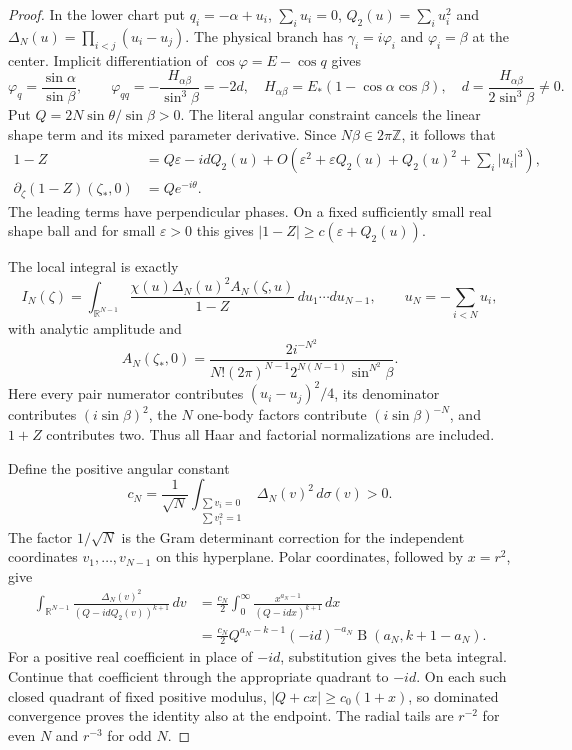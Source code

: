 \documentclass[11pt]{article}
\numberwithin{equation}{section}
\theoremstyle{definition}
\newcommand{\R}{\mathbb R}
\newcommand{\Z}{\mathbb Z}
\newcommand{\eps}{\varepsilon}
\begin{document}
\begin{proof}
In the lower chart put $q_i=-\alpha+u_i$, $\sum_i u_i=0$,
$Q_2(u)=\sum_i u_i^2$ and $\Delta_N(u)=\prod_{i<j}(u_i-u_j)$.
The physical branch has $\gamma_i=i\varphi_i$ and
$\varphi_i=\beta$ at the center. Implicit differentiation of
$\cos\varphi=E-\cos q$ gives
\[
 \varphi_q=\frac{\sin\alpha}{\sin\beta},\qquad
 \varphi_{qq}=-\frac{H_{\alpha\beta}}{\sin^3\beta}=-2d,
 \quad H_{\alpha\beta}=E_*(1-\cos\alpha\cos\beta),
 \quad d=\frac{H_{\alpha\beta}}{2\sin^3\beta}\ne0.
\]
Put $Q=2N\sin\theta/\sin\beta>0$. The literal angular constraint
cancels the linear shape term and its mixed parameter derivative.
Since $N\beta\in2\pi\Z$, it follows that
\begin{align}
 1-Z&=Q\eps-id Q_2(u)
   +O\left(\eps^2+\eps Q_2(u)+Q_2(u)^2+\sum_i|u_i|^3\right),
                                                     \label{iso:local-q}\\
 \partial_\zeta(1-Z)(\zeta_*,0)&=Qe^{-i\theta}.
                                                     \label{iso:local-derivative}
\end{align}
The leading terms have perpendicular phases. On a fixed sufficiently
small real shape ball and for small $\eps>0$ this gives
$|1-Z|\ge c(\eps+Q_2(u))$.

The local integral is exactly
\[
 I_N(\zeta)=\int_{\R^{N-1}}
       \frac{\chi(u)\Delta_N(u)^2 A_N(\zeta,u)}{1-Z}\,
                          du_1\cdots du_{N-1},
 \qquad u_N=-\sum_{i<N}u_i,
\]
with analytic amplitude and
\[
 A_N(\zeta_*,0)=
 \frac{2i^{-N^2}}{N!(2\pi)^{N-1}2^{N(N-1)}\sin^{N^2}\beta}.
\]
Here every pair numerator contributes $(u_i-u_j)^2/4$, its
denominator contributes $(i\sin\beta)^2$, the $N$ one-body
factors contribute $(i\sin\beta)^{-N}$, and $1+Z$ contributes
two. Thus all Haar and factorial normalizations are included.

Define the positive angular constant
\[
 c_N=\frac1{\sqrt N}
   \int_{\substack{\sum v_i=0\\\sum v_i^2=1}}
                 \Delta_N(v)^2\,d\sigma(v)>0.
\]
The factor $1/\sqrt N$ is the Gram determinant correction for
the independent coordinates $v_1,\ldots,v_{N-1}$ on this
hyperplane. Polar coordinates, followed by $x=r^2$, give
\begin{align*}
 \int_{\R^{N-1}}\frac{\Delta_N(v)^2}{(Q-id Q_2(v))^{k+1}}\,dv
 &=\frac{c_N}{2}\int_0^\infty
                \frac{x^{a_N-1}}{(Q-id x)^{k+1}}\,dx\\
 &=\frac{c_N}{2}Q^{a_N-k-1}(-id)^{-a_N}
                         \operatorname B(a_N,k+1-a_N).
\end{align*}
For a positive real coefficient in place of $-id$, substitution
gives the beta integral. Continue that coefficient through the
appropriate quadrant to $-id$. On each such closed quadrant of
fixed positive modulus, $|Q+cx|\ge c_0(1+x)$, so dominated
convergence proves the identity also at the endpoint. The radial
tails are $r^{-2}$ for even $N$ and $r^{-3}$ for odd $N$.


\end{proof}
\end{document}
